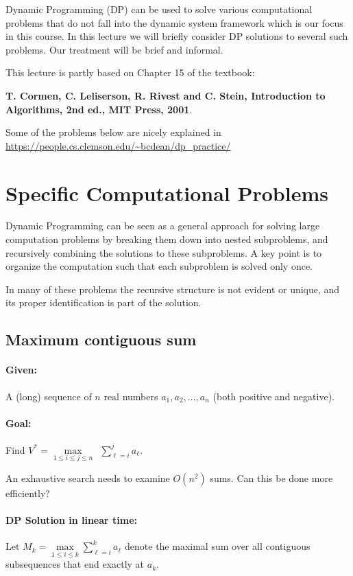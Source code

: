 Dynamic Programming (DP) can be used to solve various computational problems that do not fall into the dynamic system framework which is our focus in this course. In this lecture we will briefly consider DP solutions to several such problems. Our treatment will be brief and informal.

This lecture is partly based on Chapter 15 of the textbook:

\textbf{T. Cormen, C. Leliserson, R. Rivest and C. Stein, Introduction to Algorithms, 2nd ed., MIT Press, 2001}.

Some of the problems below are nicely explained in
\url{https://people.cs.clemson.edu/~bcdean/dp_practice/}

\section{Specific Computational Problems }

Dynamic Programming can be seen as a general approach for solving large computation problems by breaking them down into nested subproblems, and recursively combining the solutions to these subproblems. A key point is to organize the computation such that each subproblem is solved only once.

In many of these problems the recursive structure is not evident or unique, and its proper identification is part of the solution.

\subsection{Maximum contiguous sum}
\paragraph{Given: }  A (long) sequence of $n$ real numbers ${a_1},{a_2}, \ldots ,{a_n}$ (both positive and negative).
\paragraph{Goal:}   Find  ${V^*} = \mathop {\max }\limits_{1 \le i \le j \le n} \;\,\sum\limits_{\ell  = i}^j {{a_\ell }} .$

An exhaustive search needs to examine $O({n^2})$ sums. Can this be done more efficiently?

\paragraph{DP Solution in linear time:}
Let   ${M_k} = \mathop {\max }\limits_{1 \le i \le k} \sum\limits_{\ell  = i}^k {{a_\ell }} $  denote the maximal sum over all contiguous subsequences that end exactly at ${a_k}$.

